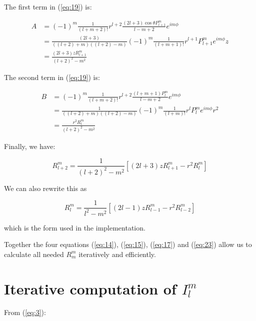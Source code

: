 \documentclass{article}
\begin{document}
The first term in (\ref{eq:19}) is:

\begin{equation}
  \begin{split}
    A & = (-1)^m \frac{1}{(l+m+2)!} r^{l+2} \frac{(2l+3)\cos{\theta}P^m_{l+1}}{l-m+2} e^{i m \phi} \\
    & = \frac{(2l+3)}{\left( \left(l+2\right) + m \right)\left( \left(l+2\right) - m \right)} (-1)^m \frac{1}{(l+m+1)!} r^{l+1} P^m_{l+1} e^{im\phi} z \\
    & = \frac{(2l+3) z R^m_{l+1} }{(l+2)^2 - m^2}
  \end{split}
\end{equation}

The second term in (\ref{eq:19}) is:

\begin{equation}
  \begin{split}
    B & = (-1)^m \frac{1}{(l+m+2)!} r^{l+2} \frac{(l+m+1)P^m_l}{l-m+2} e^{i m \phi} \\
    & = \frac{1}{\left( \left(l+2\right) + m \right)\left( \left(l+2\right) - m \right)} (-1)^m \frac{1}{(l+m)!} r^l P^m_l e^{im\phi} r^2\\
    & = \frac{ r^2 R^m_l }{(l+2)^2 - m^2}
  \end{split}
\end{equation}

Finally, we have:

\begin{equation}
R^m_{l+2} = \frac{1}{(l+2)^2-m^2} \left[ (2l+3) z R^m_{l+1} - r^2 R^m_l \right]
\end{equation}

We can also rewrite this as

\begin{equation} \label{eq:23}
\boxed{R^m_l = \frac{1}{l^2-m^2} \left[ (2l-1) z R^m_{l-1} - r^2 R^m_{l-2} \right]}
\end{equation}

which is the form used in the implementation.

Together the four equations (\ref{eq:14}), (\ref{eq:15}), (\ref{eq:17}) and (\ref{eq:23}) allow us to calculate all needed $R^m_m$ iteratively and efficiently.


\section{Iterative computation of $I^m_l$}

From (\ref{eq:3}):
\end{document}
